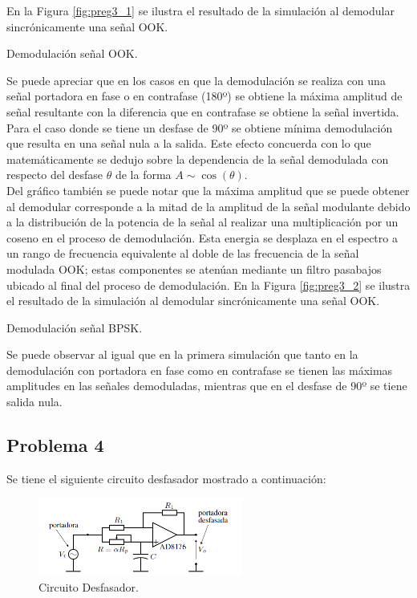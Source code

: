 \documentclass[letterpaper, titlepage]{article}
\begin{document}
		En la Figura \ref{fig:preg3_1} se ilustra el resultado de la simulación al demodular sincrónicamente una señal OOK.
	
			{Demodulación señal OOK.}
		
		Se puede apreciar que en los casos en que la demodulación se realiza con una señal portadora en fase o en contrafase (180º) se obtiene la máxima amplitud de señal resultante con la diferencia que en contrafase se obtiene la señal invertida. Para el caso donde se tiene un desfase de 90º se obtiene mínima demodulación que resulta en una señal nula a la salida. Este efecto concuerda con lo que matemáticamente se dedujo sobre la dependencia de la señal demodulada con respecto del desfase $\theta$ de la forma $A\sim\cos(\theta)$.\\
		
		Del gráfico también se puede notar que la máxima amplitud que se puede obtener al demodular corresponde a la mitad de la amplitud de la señal modulante debido a la distribución de la potencia de la señal al realizar una multiplicación por un coseno en el proceso de demodulación. Esta energia se desplaza en el espectro a un rango de frecuencia equivalente al doble de las frecuencia de la señal modulada OOK; estas componentes se atenúan mediante un filtro pasabajos ubicado al final del proceso de demodulación.
		\newpage
		En la Figura \ref{fig:preg3_2} se ilustra el resultado de la simulación al demodular sincrónicamente una señal OOK.
	
			{Demodulación señal BPSK.}
		
		Se puede observar al igual que en la primera simulación que tanto en la demodulación con portadora en fase como en contrafase se tienen las máximas amplitudes en las señales demoduladas, mientras que en el desfase de 90º se tiene salida nula.
		\newpage
	\subsection{Problema 4}
	
		Se tiene el siguiente circuito desfasador mostrado a continuación:
	
		\begin{figure}[H]
			\centering
				\includegraphics[width=0.6\textwidth]{circuitdesf}
			\caption{Circuito Desfasador.}
			\label{fig:ejemplo}
		\end{figure}
\end{document}
